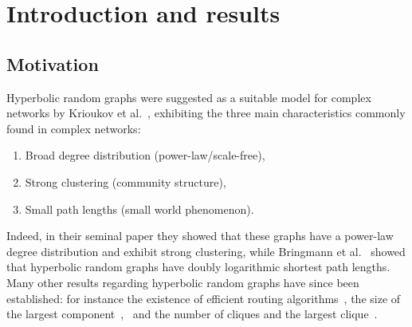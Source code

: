 \section{Introduction and results}

\subsection{Motivation}


Hyperbolic random graphs were suggested as a suitable model for complex networks by Krioukov et al.~\cite{krioukov2010hyperbolic}, exhibiting the three main characteristics commonly found in complex networks: 
\begin{enumerate}[\upshape 1)]
\item Broad degree distribution (power-law/scale-free),
\item Strong clustering (community structure),
\item Small path lengths (small world phenomenon).
\end{enumerate}
Indeed, in their seminal paper they showed that these graphs have a power-law degree distribution and exhibit strong clustering, while Bringmann et al.~\cite{bringmann2016average} showed that hyperbolic random graphs have doubly logarithmic shortest path lengths. Many other results regarding hyperbolic random graphs have since been established: for instance the existence of efficient routing algorithms~\cite{bringmann2017greedy}, the size of the largest component~\cite{bode2015largest},~\cite{fountoulakis2018law} and the number of cliques and the largest clique~\cite{blasius2018cliques}. 

